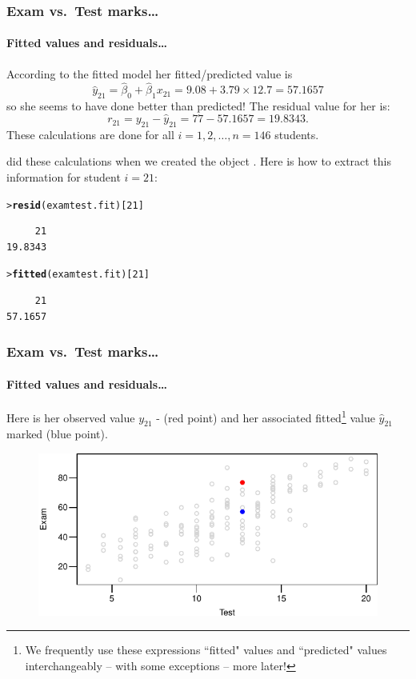 \documentclass{beamer}\usepackage[]{graphicx}\usepackage[]{xcolor}
\makeatletter
\newcommand{\hlnum}[1]{\textcolor[rgb]{0.686,0.059,0.569}{#1}}%
\newcommand{\hlstd}[1]{\textcolor[rgb]{0.345,0.345,0.345}{#1}}%
\newcommand{\hlkwd}[1]{\textcolor[rgb]{0.737,0.353,0.396}{\textbf{#1}}}%
\newenvironment{kframe}{%
 \def\at@end@of@kframe{}%
 \ifinner\ifhmode%
  \def\at@end@of@kframe{\end{minipage}}%
  \begin{minipage}{\columnwidth}%
 \fi\fi%
 \def\FrameCommand##1{\hskip\@totalleftmargin \hskip-\fboxsep
 \colorbox{shadecolor}{##1}\hskip-\fboxsep
     \hskip-\linewidth \hskip-\@totalleftmargin \hskip\columnwidth}%
 \MakeFramed {\advance\hsize-\width
   \@totalleftmargin\z@ \linewidth\hsize
   \@setminipage}}%
 {\par\unskip\endMakeFramed%
 \at@end@of@kframe}
\newenvironment{knitrout}{}{} %
\makeatother
\begin{document}
\begin{frame}[fragile]
\frametitle{Exam vs.\ Test marks\ldots}
\framesubtitle{Fitted values and residuals\ldots}

According to the fitted model her fitted/predicted value is
\[
\hat{y}_{21}=\hat{\beta}_0+\hat{\beta}_1x_{21} =9.08+3.79\times 12.7=57.1657
\]
so she seems to have done better than predicted!
The residual value for her is:
\[
r_{21}={y}_{21}-\hat{y}_{21}=77-57.1657=19.8343.
\]
These calculations are done for all $i=1,2,\ldots, n=146$ students.

 did these calculations when we created the  object .
Here is how to extract this information for student $i=21$:
\begin{knitrout}\scriptsize
{}\color{fgcolor}\begin{kframe}
\begin{alltt}
\hlstd{> }\hlkwd{resid}\hlstd{(examtest.fit)[}\hlnum{21}\hlstd{]}
\end{alltt}
\begin{verbatim}
     21 
19.8343 
\end{verbatim}
\begin{alltt}
\hlstd{> }\hlkwd{fitted}\hlstd{(examtest.fit)[}\hlnum{21}\hlstd{]}
\end{alltt}
\begin{verbatim}
     21 
57.1657 
\end{verbatim}
\end{kframe}
\end{knitrout}

\end{frame}

\begin{frame}[fragile]
\frametitle{Exam vs.\ Test marks\ldots}
\framesubtitle{Fitted values and residuals\ldots}
Here is her observed value $y_{21}$  - ({\color{red}red} point) and her associated fitted\footnote{We frequently use these expressions ``fitted" values and ``predicted" values interchangeably -- with some exceptions -- more later!}  value $\hat{y}_{21}$ marked ({\color{blue}blue} point).




\begin{figure}
  \centering
  \includegraphics{figure/RC-H02-005}
\end{figure}

\end{frame}
\end{document}
